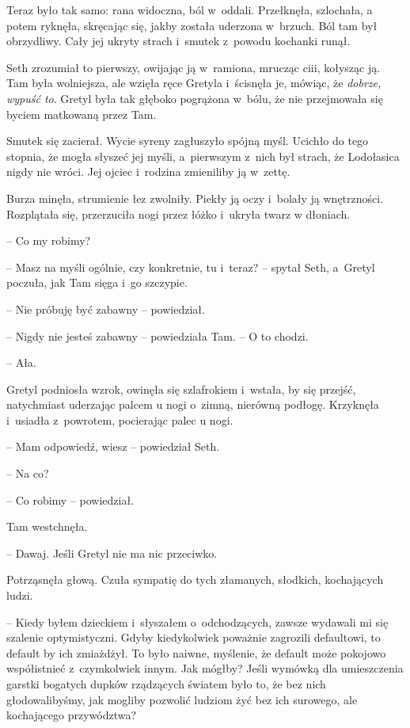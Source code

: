 \documentclass[oneside,polish,11pt,sfheadings]{mwbk}
\begin{document}
Teraz było tak samo: rana widoczna, ból w~oddali. Przełknęła, szlochała,
a potem ryknęła, skręcając się, jakby została uderzona w~brzuch. Ból tam
był obrzydliwy. Cały jej ukryty strach i~smutek z~powodu kochanki runął.

Seth zrozumiał to pierwszy, owijając ją w~ramiona, mrucząc ciii,
kołysząc ją. Tam była wolniejsza, ale wzięła ręce Gretyla i~ścisnęła je,
mówiąc, że \textit{dobrze, wypuść to}. Gretyl była tak głęboko pogrążona w~bólu, że nie przejmowała się byciem matkowaną przez Tam.

Smutek się zacierał. Wycie syreny zagłuszyło spójną myśl. Ucichło do
tego stopnia, że mogła słyszeć jej myśli, a~pierwszym z~nich był strach,
że Lodołasica nigdy nie wróci. Jej ojciec i~rodzina zmieniliby ją w~zettę.

Burza minęła, strumienie łez zwolniły. Piekły ją oczy i~bolały ją
wnętrzności. Rozplątała się, przerzuciła nogi przez łóżko i~ukryła twarz
w dłoniach.

-- Co my robimy?

-- Masz na myśli ogólnie, czy konkretnie, tu i~teraz? -- spytał Seth, a~Gretyl poczuła, jak Tam sięga i~go szczypie.

-- Nie próbuję być zabawny -- powiedział.

-- Nigdy nie jesteś zabawny -- powiedziała Tam. -- O to chodzi.

-- Ała.

Gretyl podniosła wzrok, owinęła się szlafrokiem i~wstała, by się
przejść, natychmiast uderzając palcem u nogi o~zimną, nierówną podłogę.
Krzyknęła i~usiadła z~powrotem, pocierając palec u nogi.

-- Mam odpowiedź, wiesz -- powiedział Seth.

-- Na co?

-- Co robimy -- powiedział.

Tam westchnęła. 

-- Dawaj. Jeśli Gretyl nie ma nic przeciwko.

Potrząsnęła głową. Czuła sympatię do tych złamanych, słodkich,
kochających ludzi.

-- Kiedy byłem dzieckiem i~słyszałem o~odchodzących, zawsze wydawali mi
się szalenie optymistyczni. Gdyby kiedykolwiek poważnie zagrozili
defaultowi, to default by ich zmiażdżył. To było naiwne, myślenie, że
default może pokojowo współistnieć z~czymkolwiek innym. Jak mógłby?
Jeśli wymówką dla umieszczenia garstki bogatych dupków rządzących
światem było to, że bez nich głodowalibyśmy, jak mogliby pozwolić
ludziom żyć bez ich surowego, ale kochającego przywództwa?
\end{document}
